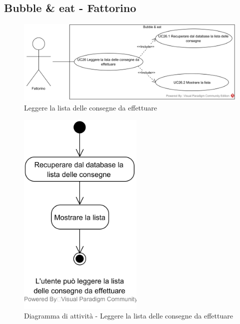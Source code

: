 \subsection{Bubble \& eat - Fattorino}


\begin{figure}[H]
	\centering
	\includegraphics[width=15cm]{../../documenti/AnalisiDeiRequisiti/Diagrammi_img/usecase/uc3_9.png}
	\caption{\UCCaption{} Leggere la lista delle consegne da effettuare}
\end{figure}

\begin{figure}[H]
	\centering
	\includegraphics[height=10cm]{../../documenti/AnalisiDeiRequisiti/Diagrammi_img/attivita/uc_bubble_leggere_consegne.png}
	\caption{Diagramma di attività - Leggere la lista delle consegne da effettuare}
\end{figure}

